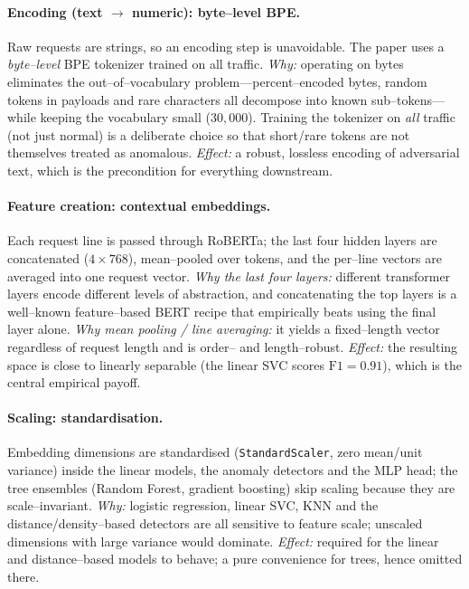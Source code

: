 \documentclass[11pt,a4paper]{article}
\begin{document}
\paragraph{Encoding (text $\rightarrow$ numeric): byte--level BPE.} Raw requests are
strings, so an encoding step is unavoidable. The paper uses a \emph{byte--level} BPE
tokenizer trained on all traffic. \emph{Why:} operating on bytes eliminates the
out--of--vocabulary problem---percent--encoded bytes, random tokens in payloads and
rare characters all decompose into known sub--tokens---while keeping the vocabulary small
($30{,}000$). Training the tokenizer on \emph{all} traffic (not just normal) is a
deliberate choice so that short/rare tokens are not themselves treated as anomalous.
\emph{Effect:} a robust, lossless encoding of adversarial text, which is the precondition
for everything downstream.

\paragraph{Feature creation: contextual embeddings.} Each request line is passed through
RoBERTa; the last four hidden layers are concatenated ($4\times768$), mean--pooled over
tokens, and the per--line vectors are averaged into one request vector. \emph{Why the
last four layers:} different transformer layers encode different levels of abstraction, and
concatenating the top layers is a well--known feature--based BERT recipe that empirically
beats using the final layer alone. \emph{Why mean pooling / line averaging:} it yields a
fixed--length vector regardless of request length and is order-- and length--robust.
\emph{Effect:} the resulting space is close to linearly separable (the linear SVC scores
$\text{F1}=0.91$), which is the central empirical payoff.

\paragraph{Scaling: standardisation.} Embedding dimensions are standardised
(\texttt{StandardScaler}, zero mean/unit variance) inside the linear models, the anomaly
detectors and the MLP head; the tree ensembles (Random Forest, gradient boosting) skip
scaling because they are scale--invariant. \emph{Why:} logistic regression, linear SVC,
KNN and the distance/density--based detectors are all sensitive to feature scale;
unscaled dimensions with large variance would dominate. \emph{Effect:} required for the
linear and distance--based models to behave; a pure convenience for trees, hence omitted
there.
\end{document}
